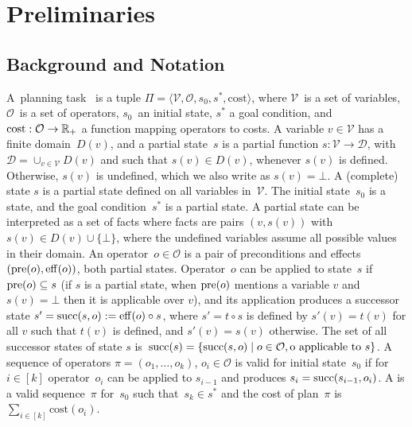 \chapter{Preliminaries}\label{sec:preliminaries}


\section{Background and Notation}

A~\sas planning task~\cite{Backstrom.Nebel/1995} is a tuple $\Pi=\langle\mathcal{V},\mathcal{O},s_0,s^*, \text{cost}\rangle$, where $\mathcal{V}$~is a set of variables, $\mathcal{O}$~is a set of operators, $s_0$~an initial state, $s^*$ a goal condition, and $\text{cost}:\mathcal{O}\rightarrow\mathbb{R}_{+}$ a function mapping operators to costs. A variable $v\in \mathcal{V}$ has a finite domain~$D(v)$, and a partial state~$s$ is a partial function $s:\mathcal{V}\rightarrow \mathcal{D}$, with $\mathcal{D}=\cup_{v\in \mathcal{V}}D(v)$ and such that $s(v)\in D(v)$, whenever $s(v)$ is defined. Otherwise, $s(v)$ is undefined, which we also write as $s(v)=\bot$. A (complete) state $s$ is a partial state defined on all variables in~$\mathcal{V}$. The initial state~$s_0$ is a state, and the goal condition~$s^*$ is a partial state. A partial state can be interpreted as a set of facts where facts are pairs $(v,s(v))$ with $s(v)\in D(v) \cup \{\bot\}$, where the undefined variables assume all possible values in their domain. An operator~$o\in \mathcal{O}$ is a pair of preconditions and effects $(\operatorname{pre}(o),\operatorname{eff}(o))$, both partial states. Operator~$o$ can be applied to state~$s$ if $\operatorname{pre}(o)\subseteq s$ (if $s$ is a partial state, when $\operatorname{pre}(o)$ mentions a variable $v$ and $s(v) = \bot$ then it is applicable over $v$), and its application produces a successor state $s'=\operatorname{succ}(s,o):=\operatorname{eff}(o)\circ s$, where $s'=t\circ s$ is defined by $s'(v)=t(v)$ for all $v$ such that $t(v)$ is defined, and $s'(v)=s(v)$ otherwise. The set of all successor states of state $s$ is~$\operatorname{succ}(s)=\{\operatorname{succ}(s,o)\mid o\in \mathcal{O}, \text{o applicable to }s\}$.  A sequence of operators $\pi=(o_1,\ldots,o_k)$, $o_i\in \mathcal{O}$ is valid for initial state~$s_0$ if for $i\in[k]$ operator~$o_i$ can be applied to $s_{i-1}$ and produces $s_i=\operatorname{succ}(s_{i-1},o_i)$. A  is a valid sequence~$\pi$ for~$s_0$ such that~$s_k\in s^*$ and the cost of plan~$\pi$ is $\sum_{i\in[k]} \text{cost}(o_i)$.

